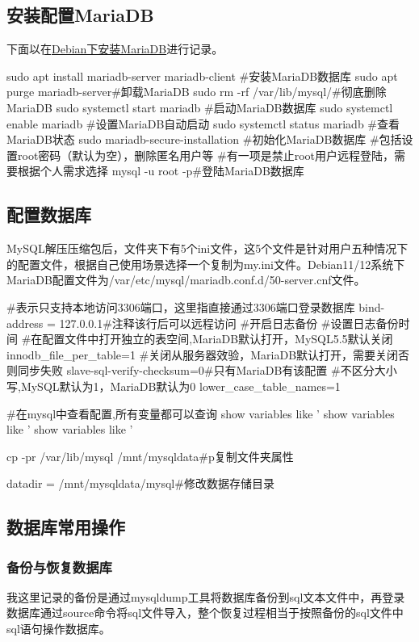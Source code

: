 \subsection{安装配置MariaDB}
下面以在\href{https://blog.csdn.net/erliujian111/article/details/135732876?spm=1001.2014.3001.5506}{Debian下安装MariaDB}进行记录。
\begin{shell}
sudo apt install mariadb-server mariadb-client
#安装MariaDB数据库
sudo apt purge mariadb-server#卸载MariaDB
sudo rm -rf /var/lib/mysql/#彻底删除MariaDB
sudo systemctl start mariadb #启动MariaDB数据库
sudo systemctl enable mariadb #设置MariaDB自动启动
sudo systemctl status mariadb #查看MariaDB状态
sudo mariadb-secure-installation #初始化MariaDB数据库
#包括设置root密码（默认为空），删除匿名用户等
#有一项是禁止root用户远程登陆，需要根据个人需求选择
mysql -u root -p#登陆MariaDB数据库
\end{shell}
\subsection{配置数据库}
MySQL解压压缩包后，文件夹下有5个ini文件，这5个文件是针对用户五种情况下的配置文件，根据自己使用场景选择一个复制为my.ini文件。Debian11/12系统下MariaDB配置文件为/var/etc/mysql/mariadb.conf.d/50-server.cnf文件。
\begin{shell}
#表示只支持本地访问3306端口，这里指直接通过3306端口登录数据库
bind-address = 127.0.0.1#注释该行后可以远程访问
#开启日志备份
#设置日志备份时间
#在配置文件中打开独立的表空间,MariaDB默认打开，MySQL5.5默认关闭
innodb_file_per_table=1
#关闭从服务器效验，MariaDB默认打开，需要关闭否则同步失败
slave-sql-verify-checksum=0#只有MariaDB有该配置
#不区分大小写,MySQL默认为1，MariaDB默认为0
lower_case_table_names=1


#在mysql中查看配置,所有变量都可以查询
show variables like '%
show variables like '%
show variables like '%

cp -pr /var/lib/mysql /mnt/mysqldata#p复制文件夹属性

datadir = /mnt/mysqldata/mysql#修改数据存储目录
\end{shell}
\subsection{数据库常用操作}
\subsubsection{备份与恢复数据库}
我这里记录的备份是通过mysqldump工具将数据库备份到sql文本文件中，再登录数据库通过source命令将sql文件导入，整个恢复过程相当于按照备份的sql文件中sql语句操作数据库。

